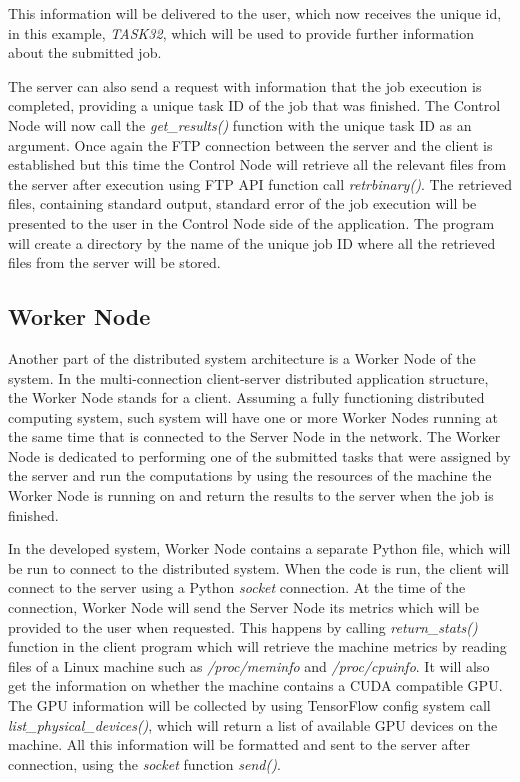 \documentclass[10pt]{report}
\begin{document}
This information will be delivered to the user, which now receives the unique id, in this example, \textit{TASK32}, which will be used to provide further information about the submitted job.
\newline

The server can also send a request with information that the job execution is completed, providing a unique task ID of the job that was finished. The Control Node will now call the \textit{get\_results()} function with the unique task ID as an argument. Once again the FTP connection between the server and the client is established but this time the Control Node will retrieve all the relevant files from the server after execution using FTP API function call \textit{retrbinary()}. The retrieved files, containing standard output, standard error of the job execution will be presented to the user in the Control Node side of the application. The program will create a directory by the name of the unique job ID where all the retrieved files from the server will be stored.

\subsection{Worker Node}

Another part of the distributed system architecture is a Worker Node of the system. In the multi-connection client-server distributed application structure, the Worker Node stands for a client. Assuming a fully functioning distributed computing system, such system will have one or more Worker Nodes running at the same time that is connected to the Server Node in the network. The Worker Node is dedicated to performing one of the submitted tasks that were assigned by the server and run the computations by using the resources of the machine the Worker Node is running on and return the results to the server when the job is finished.
\newline

In the developed system, Worker Node contains a separate Python file, which will be run to connect to the distributed system. When the code is run, the client will connect to the server using a Python \textit{socket} connection. At the time of the connection, Worker Node will send the Server Node its metrics which will be provided to the user when requested. This happens by calling \textit{return\_stats()} function in the client program which will retrieve the machine metrics by reading files of a Linux machine such as \textit{/proc/meminfo} and \textit{/proc/cpuinfo}. It will also get the information on whether the machine contains a CUDA compatible GPU. The GPU information will be collected by using TensorFlow config system call \textit{list\_physical\_devices()}, which will return a list of available GPU devices on the machine. All this information will be formatted and sent to the server after connection, using the \textit{socket} function \textit{send()}.
\newline
\end{document}
